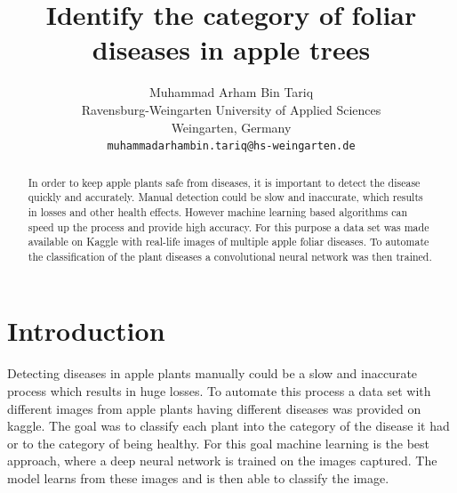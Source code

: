 \documentclass[10pt,twocolumn,letterpaper]{article}
\begin{document}
\title{Identify the category of foliar diseases in apple trees}

\author{Muhammad Arham Bin Tariq\\
Ravensburg-Weingarten University of Applied Sciences\\
Weingarten, Germany\\
{\tt\small muhammadarhambin.tariq@hs-weingarten.de}
}

\maketitle

\begin{abstract}
In order to keep apple plants safe from diseases, it is important to detect the disease quickly and accurately. Manual detection could be slow and inaccurate, which results in losses and other health effects. However machine learning based algorithms can speed up the process and provide high accuracy. For this purpose a data set was made available on Kaggle with real-life images of multiple apple foliar diseases. To automate the classification of the plant diseases a convolutional neural network was then trained.
\end{abstract}

\section{Introduction}
Detecting diseases in apple plants manually could be a slow and inaccurate process which results in huge losses. To automate this process a data set with different images from apple plants having different diseases was provided on kaggle. The goal was to classify each plant into the category of the disease it had or to the category of being healthy. For this goal machine learning is the best approach, where a deep neural network is trained on the images captured. The model learns from these images and is then able to classify the image. 


\end{document}
